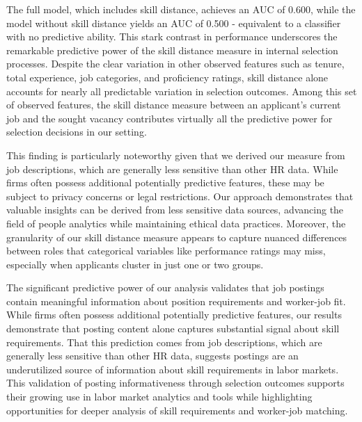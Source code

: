 The full model, which includes skill distance, achieves an AUC of 0.600, while the model without skill distance yields an AUC of 0.500 - equivalent to a classifier with no predictive ability. This stark contrast in performance underscores the remarkable predictive power of the skill distance measure in internal selection processes. Despite the clear variation in other observed features such as tenure, total experience, job categories, and proficiency ratings, skill distance alone accounts for nearly all predictable variation in selection outcomes. Among this set of observed features, the skill distance measure between an applicant's current job and the sought vacancy contributes virtually all the predictive power for selection decisions in our setting.

This finding is particularly noteworthy given that we derived our measure from job descriptions, which are generally less sensitive than other HR data. While firms often possess additional potentially predictive features, these may be subject to privacy concerns or legal restrictions. Our approach demonstrates that valuable insights can be derived from less sensitive data sources, advancing the field of people analytics while maintaining ethical data practices. Moreover, the granularity of our skill distance measure appears to capture nuanced differences between roles that categorical variables like performance ratings may miss, especially when applicants cluster in just one or two groups.


The significant predictive power of our analysis validates that job postings contain meaningful information about position requirements and worker-job fit. While firms often possess additional potentially predictive features, our results demonstrate that posting content alone captures substantial signal about skill requirements. That this prediction comes from job descriptions, which are generally less sensitive than other HR data, suggests postings are an underutilized source of information about skill requirements in labor markets. This validation of posting informativeness through selection outcomes supports their growing use in labor market analytics and tools while highlighting opportunities for deeper analysis of skill requirements and worker-job matching. 
